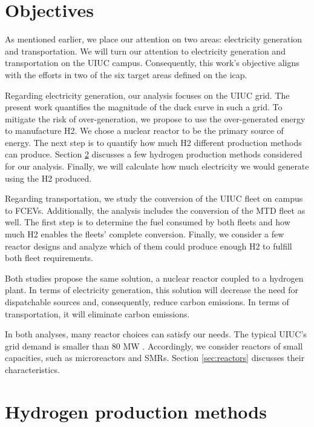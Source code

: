 \documentclass[11pt,letterpaper]{article}
\begin{document}
\section{Objectives}

As mentioned earlier, we place our attention on two areas: electricity generation and transportation.
We will turn our attention to electricity generation and transportation on the \gls{UIUC} campus.
Consequently, this work's objective aligns with the efforts in two of the six target areas defined on the \gls{icap}.

Regarding electricity generation, our analysis focuses on the \gls{UIUC} grid.
The present work quantifies the magnitude of the duck curve in such a grid.
To mitigate the risk of over-generation, we propose to use the over-generated energy to manufacture \gls{H2}.
We chose a nuclear reactor to be the primary source of energy.
The next step is to quantify how much \gls{H2} different production methods can produce.
Section \ref{sec:hydro} discusses a few hydrogen production methods considered for our analysis.
Finally, we will calculate how much electricity we would generate using the \gls{H2} produced.

Regarding transportation, we study the conversion of the \gls{UIUC} fleet on campus to \glspl{FCEV}.
Additionally, the analysis includes the conversion of the \gls{MTD} fleet as well.
The first step is to determine the fuel consumed by both fleets and how much \gls{H2} enables the fleets' complete conversion.
Finally, we consider a few reactor designs and analyze which of them could produce enough \gls{H2} to fulfill both fleet requirements.

Both studies propose the same solution, a nuclear reactor coupled to a hydrogen plant.
In terms of electricity generation, this solution will decrease the need for dispatchable sources and, consequently, reduce carbon emissions.
In terms of transportation, it will eliminate carbon emissions.

In both analyses, many reactor choices can satisfy our needs.
The typical \gls{UIUC}'s grid demand is smaller than 80 MW \cite{dotson_optimal_2020}.
Accordingly, we consider reactors of small capacities, such as microreactors and \glspl{SMR}.
Section \ref{sec:reactors} discusses their characteristics.

\section{Hydrogen production methods}
\label{sec:hydro}
\end{document}

